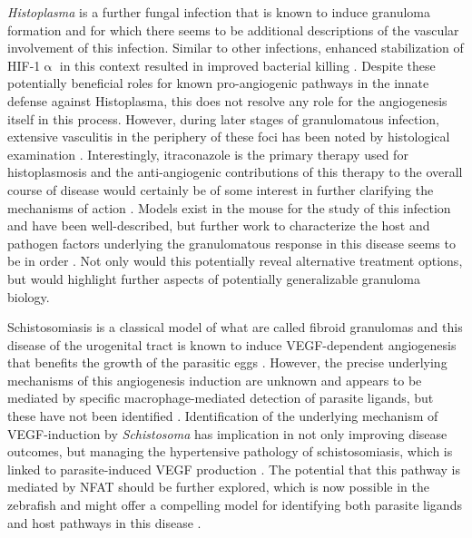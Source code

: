 \textit{Histoplasma} is a further fungal infection that is known to induce granuloma formation and for which there seems to be additional descriptions of the vascular involvement of this infection. Similar to other infections, enhanced stabilization of HIF\hyp{}1$\upalpha$ in this context resulted in improved bacterial killing \citep{Friedrich2017, Friedrich2019}. Despite these potentially beneficial roles for known pro\hyp{}angiogenic pathways in the innate defense against Histoplasma, this does not resolve any role for the angiogenesis itself in this process. However, during later stages of granulomatous infection, extensive vasculitis in the periphery of these foci has been noted by histological examination \citep{Mukhopadhyay2010, Kauffman2007, Mann2000}. Interestingly, itraconazole is the primary therapy used for histoplasmosis and the anti\hyp{}angiogenic contributions of this therapy to the overall course of disease would certainly be of some interest in further clarifying the mechanisms of action \citep{Kauffman2007}. Models exist in the mouse for the study of this infection and have been well\hyp{}described, but further work to characterize the host and pathogen factors underlying the granulomatous response in this disease seems to be in order \citep{Heninger2006}. Not only would this potentially reveal alternative treatment options, but would highlight further aspects of potentially generalizable granuloma biology.

Schistosomiasis is a classical model of what are called fibroid granulomas and this disease of the urogenital tract is known to induce VEGF\hyp{}dependent angiogenesis that benefits the growth of the parasitic eggs \citep{Shariati2011, Pereira2013, Figueiredo2015, Chabon2014, Loeffler2002}. However, the precise underlying mechanisms of this angiogenesis induction are unknown and appears to be mediated by specific macrophage\hyp{}mediated detection of parasite ligands, but these have not been identified \citep{Loeffler2002}. Identification of the underlying mechanism of VEGF\hyp{}induction by \textit{Schistosoma} has implication in not only improving disease outcomes, but managing the hypertensive pathology of schistosomiasis, which is linked to parasite\hyp{}induced VEGF production \citep{Chabon2014}. The potential that this pathway is mediated by NFAT should be further explored, which is now possible in the zebrafish and might offer a compelling model for identifying both parasite ligands and host pathways in this disease \citep{Takaki2021}. 


